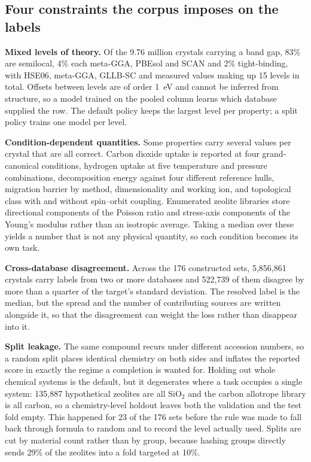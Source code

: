 \subsection{Four constraints the corpus imposes on the labels}

\textbf{Mixed levels of theory.} Of the 9.76 million crystals carrying a band
gap, 83\% are semilocal, 4\% each meta-GGA, PBEsol and SCAN and 2\% tight-binding, with
HSE06, meta-GGA, GLLB-SC and measured values making up 15 levels in total.
Offsets between levels are of order 1~eV and cannot be inferred from structure,
so a model trained on the pooled column learns which database supplied the row.
The default policy keeps the largest level per property; a split policy trains
one model per level.

\textbf{Condition-dependent quantities.} Some properties carry several values per
crystal that are all correct. Carbon dioxide uptake is reported at four
grand-canonical conditions, hydrogen uptake at five temperature and pressure
combinations, decomposition energy against four different reference hulls,
migration barrier by method, dimensionality and working ion, and topological
class with and without spin--orbit coupling. Enumerated zeolite libraries store
directional components of the Poisson ratio and stress-axis components of the
Young's modulus rather than an isotropic average. Taking a median over these
yields a number that is not any physical quantity, so each condition becomes its
own task.

\textbf{Cross-database disagreement.} Across the 176 constructed sets,
5{,}856{,}861 crystals carry labels from two or more databases and 522{,}739 of
them disagree by more than a quarter of the target's standard deviation. The
resolved label is the median, but the spread and the number of contributing
sources are written alongside it, so that the disagreement can weight the loss
rather than disappear into it.

\textbf{Split leakage.} The same compound recurs under different accession
numbers, so a random split places identical chemistry on both sides and inflates
the reported score in exactly the regime a completion is wanted for. Holding out
whole chemical systems is the default, but it degenerates where a task occupies a
single system: 135{,}887 hypothetical zeolites are all SiO$_2$ and the carbon
allotrope library is all carbon, so a chemistry-level holdout leaves both the
validation and the test fold empty. This happened for 23 of the 176 sets before
the rule was made to fall back through formula to random and to record the level
actually used. Splits are cut by material count rather than by group, because
hashing groups directly sends 29\% of the zeolites into a fold targeted at 10\%.

